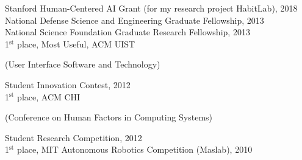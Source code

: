 \documentclass[margin,line]{resume}
\begin{document}
\begin{resume}
Stanford Human-Centered AI Grant (for my research project HabitLab), 2018\\ %
National Defense Science and Engineering Graduate Fellowship, 2013\\ %
National Science Foundation Graduate Research Fellowship, 2013\\ %
1$^{\textrm{st}}$ place, Most Useful, ACM UIST \begin{small}(User Interface Software and Technology)\end{small} Student Innovation Contest, 2012\\
1$^{\textrm{st}}$ place, ACM CHI \begin{small}(Conference on Human Factors in Computing Systems)\end{small} Student Research Competition, 2012\\
1$^{\textrm{st}}$ place, MIT Autonomous Robotics Competition (Maslab), 2010

\pagebreak








\end{resume}
\end{document}
